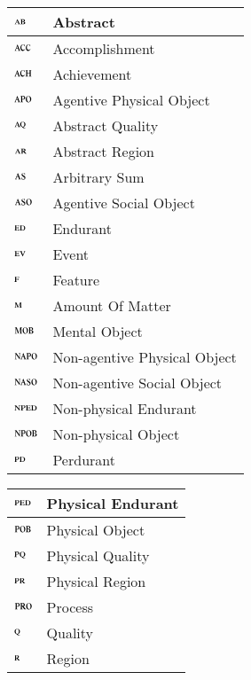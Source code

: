 \documentclass[ao]{iosart2x}
\newcommand{\dolce}{{\textsc{dolce}}}
\newcommand {\ABdcat} {\textsc{ab}}
\newcommand {\AQdcat} {\textsc{aq}}
\newcommand {\ARdcat} {\textsc{ar}}
\newcommand {\ACHdcat} {\textsc{ach}}
\newcommand {\ACCdcat} {\textsc{acc}}
\newcommand {\APOdcat} {\textsc{apo}}
\newcommand {\ASOdcat} {\textsc{aso}}
\newcommand {\Mdcat} {\textsc{m}}
\newcommand {\ASdcat} {\textsc{as}}
\newcommand {\EDdcat} {\textsc{ed}}
\newcommand {\EVdcat} {\textsc{ev}}
\newcommand {\Fdcat} {\textsc{f}}
\newcommand {\MOBdcat} {\textsc{mob}}
\newcommand {\NAPOdcat} {\textsc{napo}}
\newcommand {\NASOdcat} {\textsc{naso}}
\newcommand {\NPEDdcat} {\textsc{nped}}
\newcommand {\NPOBdcat} {\textsc{npob}}
\newcommand {\PDdcat} {\textsc{pd}}
\newcommand {\PEDdcat} {\textsc{ped}}
\newcommand {\POBdcat} {\textsc{pob}}
\newcommand {\PQdcat} {\textsc{pq}}
\newcommand {\PRdcat} {\textsc{pr}}
\newcommand {\PROdcat} {\textsc{pro}}
\newcommand {\Qdcat} {\textsc{q}}
\newcommand {\Rdcat} {\textsc{r}}
\begin{document}
\begin{table*}
\caption{Categories of {\dolce}.}\label{table_cat_dolce}
\begin{minipage}{0.45\textwidth}
\hspace{30pt}\begin{tabular}{|p{}|p{}|}
\hline
$\ABdcat$ & Abstract \\
\hline
$\ACCdcat$ & Accomplishment \\
\hline
$\ACHdcat$ & Achievement \\
\hline
$\APOdcat$ & Agentive Physical Object \\
\hline
$\AQdcat$ & Abstract Quality\\
\hline
$\ARdcat$ & Abstract Region\\
\hline
$\ASdcat$ & Arbitrary Sum \\
\hline
$\ASOdcat$ & Agentive Social Object \\
\hline
$\EDdcat$ & Endurant \\
\hline
$\EVdcat$ & Event \\
\hline
$\Fdcat$ & Feature \\
\hline
$\Mdcat$ & Amount Of Matter \\
\hline
$\MOBdcat$ & Mental Object \\
\hline
$\NAPOdcat$ & Non-agentive Physical Object \\
\hline
$\NASOdcat$ & Non-agentive Social Object \\
\hline
$\NPEDdcat$ & Non-physical Endurant \\
\hline
$\NPOBdcat$ & Non-physical Object \\
\hline
$\PDdcat$ & Perdurant \\
\hline
\end{tabular}
\end{minipage}%
\mbox{}\hfill{}
\begin{minipage}{0.45\textwidth}
\hspace{-30pt}\begin{tabular}{|p{}|p{}|}
\hline
$\PEDdcat$ & Physical Endurant \\
\hline
$\POBdcat$ & Physical Object \\
\hline
$\PQdcat$ & Physical Quality\\
\hline
$\PRdcat$ & Physical Region\\
\hline
$\PROdcat$ & Process\\
\hline
$\Qdcat$ & Quality \\
\hline
$\Rdcat$ & Region \\

\end{tabular}
\end{minipage}
\end{table*}
\end{document}
